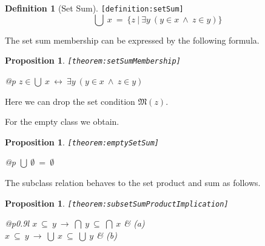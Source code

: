 \documentclass[a4paper,german,10pt,twoside]{book}
\newtheorem{prop}[thm]{Proposition}
\theoremstyle{definition}
\newtheorem{defn}{Definition}
\theoremstyle{remark}
\begin{document}
\begin{defn}[Set Sum]
\label{definition:setSum} \hypertarget{definition:setSum}{}
{\tt \tiny [\verb]definition:setSum]]}
$$\bigcup \ x \ = \ \{ z \ | \ \exists y\ (y \in x\ \land\ z \in y) \} $$
\end{defn}


\par
The set sum membership can be expressed by the following formula.

\begin{prop}
\label{theorem:setSumMembership} \hypertarget{theorem:setSumMembership}{}
{\tt \tiny [\verb]theorem:setSumMembership]]}
\mbox{}
\begin{longtable}{{@{\extracolsep{\fill}}p{\linewidth}}}
\centering $z \in \bigcup \ x\ \leftrightarrow\ \exists y\ (y \in x\ \land\ z \in y)$
\end{longtable}

\end{prop}

Here we can drop the set condition $\mathfrak{M}(z)$.


\par
For the empty class we obtain.

\begin{prop}
\label{theorem:emptySetSum} \hypertarget{theorem:emptySetSum}{}
{\tt \tiny [\verb]theorem:emptySetSum]]}
\mbox{}
\begin{longtable}{{@{\extracolsep{\fill}}p{\linewidth}}}
\centering $\bigcup \ \emptyset \ = \ \emptyset$
\end{longtable}

\end{prop}


\par
The subclass relation behaves to the set product and sum as follows.

\begin{prop}
\label{theorem:subsetSumProductImplication} \hypertarget{theorem:subsetSumProductImplication}{}
{\tt \tiny [\verb]theorem:subsetSumProductImplication]]}
\mbox{}
\begin{longtable}{{@{\extracolsep{\fill}}p{0.9\linewidth}l}}
\centering $x \ \subseteq \ y\ \rightarrow\ \bigcap \ y \ \subseteq \ \bigcap \ x$ & \label{theorem:subsetSumProductImplication/a} \hypertarget{theorem:subsetSumProductImplication/a}{} \mbox{\emph{(a)}} \\
\centering $x \ \subseteq \ y\ \rightarrow\ \bigcup \ x \ \subseteq \ \bigcup \ y$ & \label{theorem:subsetSumProductImplication/b} \hypertarget{theorem:subsetSumProductImplication/b}{} \mbox{\emph{(b)}} 
\end{longtable}

\end{prop}
\end{document}
